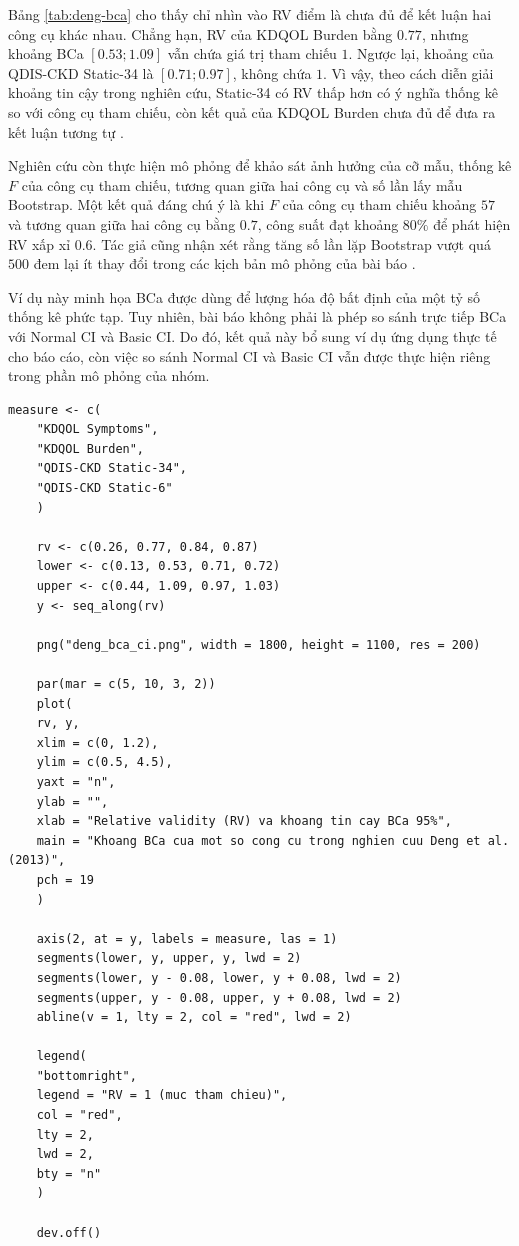Bảng \ref{tab:deng-bca} cho thấy chỉ nhìn vào RV điểm là chưa đủ để
kết luận hai công cụ khác nhau. Chẳng hạn, RV của KDQOL Burden bằng
$0.77$, nhưng khoảng BCa $[0.53;1.09]$ vẫn chứa giá trị tham chiếu $1$.
Ngược lại, khoảng của QDIS-CKD Static-34 là $[0.71;0.97]$, không chứa
$1$. Vì vậy, theo cách diễn giải khoảng tin cậy trong nghiên cứu,
Static-34 có RV thấp hơn có ý nghĩa thống kê so với công cụ tham chiếu,
còn kết quả của KDQOL Burden chưa đủ để đưa ra kết luận tương tự
\cite{deng2013}.

Nghiên cứu còn thực hiện mô phỏng để khảo sát ảnh hưởng của cỡ mẫu,
thống kê $F$ của công cụ tham chiếu, tương quan giữa hai công cụ và số
lần lấy mẫu Bootstrap. Một kết quả đáng chú ý là khi $F$ của công cụ
tham chiếu khoảng $57$ và tương quan giữa hai công cụ bằng $0.7$, công
suất đạt khoảng $80\%$ để phát hiện RV xấp xỉ $0.6$. Tác giả cũng nhận
xét rằng tăng số lần lặp Bootstrap vượt quá $500$ đem lại ít thay đổi
trong các kịch bản mô phỏng của bài báo \cite{deng2013}.

Ví dụ này minh họa BCa được dùng để lượng hóa độ bất định của một tỷ số
thống kê phức tạp. Tuy nhiên, bài báo không phải là phép so sánh trực
tiếp BCa với Normal CI và Basic CI. Do đó, kết quả này bổ sung ví dụ ứng
dụng thực tế cho báo cáo, còn việc so sánh Normal CI và Basic CI vẫn
được thực hiện riêng trong phần mô phỏng của nhóm.

\begin{lstlisting}[style=Rstyle, caption={Vẽ lại các khoảng BCa được công bố trong bài báo}, label={lst:deng-bca}]
	measure <- c(
	"KDQOL Symptoms",
	"KDQOL Burden",
	"QDIS-CKD Static-34",
	"QDIS-CKD Static-6"
	)
	
	rv <- c(0.26, 0.77, 0.84, 0.87)
	lower <- c(0.13, 0.53, 0.71, 0.72)
	upper <- c(0.44, 1.09, 0.97, 1.03)
	y <- seq_along(rv)
	
	png("deng_bca_ci.png", width = 1800, height = 1100, res = 200)
	
	par(mar = c(5, 10, 3, 2))
	plot(
	rv, y,
	xlim = c(0, 1.2),
	ylim = c(0.5, 4.5),
	yaxt = "n",
	ylab = "",
	xlab = "Relative validity (RV) va khoang tin cay BCa 95%",
	main = "Khoang BCa cua mot so cong cu trong nghien cuu Deng et al. (2013)",
	pch = 19
	)
	
	axis(2, at = y, labels = measure, las = 1)
	segments(lower, y, upper, y, lwd = 2)
	segments(lower, y - 0.08, lower, y + 0.08, lwd = 2)
	segments(upper, y - 0.08, upper, y + 0.08, lwd = 2)
	abline(v = 1, lty = 2, col = "red", lwd = 2)
	
	legend(
	"bottomright",
	legend = "RV = 1 (muc tham chieu)",
	col = "red",
	lty = 2,
	lwd = 2,
	bty = "n"
	)
	
	dev.off()
\end{lstlisting}

